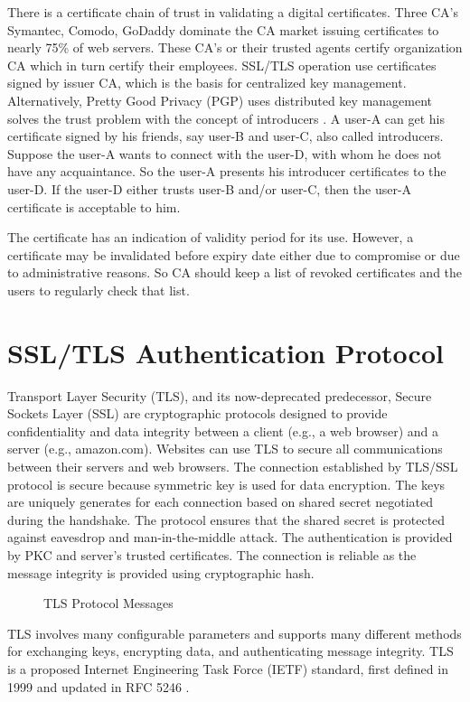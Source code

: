 \begin{multicols}{2}
There is a certificate chain of trust in validating a digital certificates. Three CA's Symantec, Comodo, GoDaddy dominate the CA market issuing certificates to nearly 75\% of web servers. These CA's or their trusted agents certify organization CA which in turn certify their employees. SSL/TLS operation use certificates signed by issuer CA, which is the basis for centralized key management. Alternatively, Pretty Good Privacy (PGP) uses distributed key management solves the trust problem with the concept of introducers \cite{key1}. A user-A can get his certificate signed by his friends, say user-B and user-C, also called introducers. Suppose the user-A wants to connect with the user-D, with whom he does not have any acquaintance. So the user-A presents his introducer certificates to the user-D. If the user-D either trusts user-B and/or user-C, then the user-A certificate is acceptable to him.

The certificate has an indication of validity period for its use. However, a certificate may be invalidated before expiry date either due to compromise or due to administrative reasons. So CA should keep a list of revoked certificates and the users to regularly check that list.

\section*{SSL/TLS Authentication Protocol}

Transport Layer Security (TLS), and its now-deprecated predecessor, Secure Sockets Layer (SSL) are cryptographic protocols designed to provide confidentiality and data integrity between a client (e.g., a web browser) and a server (e.g., amazon.com). Websites can use TLS to secure all communications between their servers and web browsers. The connection established by TLS/SSL protocol is secure because symmetric key is used for data encryption. The keys are uniquely generates for each connection based on shared secret negotiated during the handshake. The protocol ensures that the shared secret is protected against eavesdrop and man-in-the-middle attack. The authentication is provided by PKC and server's trusted certificates. The connection is reliable as the message integrity is provided using cryptographic hash.
\begin{figure}[!ht]
\centering
\caption{TLS Protocol Messages}\label{chap2-fig5}
\end{figure}

TLS involves many configurable parameters and supports many different methods for exchanging keys, encrypting data, and authenticating message integrity. TLS is a proposed Internet Engineering Task Force (IETF) standard, first defined in 1999 and updated in RFC 5246 \cite{key16}.


\end{multicols}
